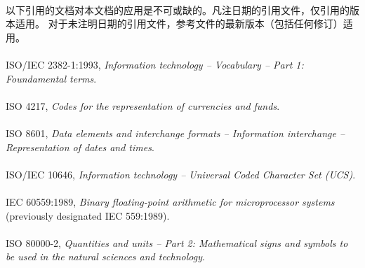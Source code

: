 
\paragraph{}
以下引用的文档对本文档的应用是不可或缺的。凡注日期的引用文件，仅引用的版本适用。
对于未注明日期的引用文件，参考文件的最新版本（包括任何修订）适用。

\paragraph{}
ISO/IEC 2382-1:1993, \textit{Information technology -- Vocabulary -- Part 1:
Foundamental terms}.

\paragraph{}
ISO 4217, \textit{Codes for the representation of currencies and funds}.

\paragraph{}
ISO 8601, \textit{Data elements and interchange formats -- Information
interchange -- Representation of dates and times}.

\paragraph{}
ISO/IEC 10646, \textit{Information technology -- Universal Coded Character Set
(UCS)}.

\paragraph{}
IEC 60559:1989, \textit{Binary floating-point arithmetic for microprocessor
systems} (previously designated IEC 559:1989).

\paragraph{}
ISO 80000-2, \textit{Quantities and units -- Part 2: Mathematical signs and
symbols to be used in the natural sciences and technology}.
